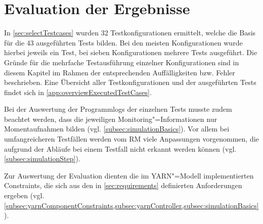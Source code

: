\chapter{Evaluation der Ergebnisse}
\label{ch:evaluationResults}

In \cref{sec:selectTestcases} wurden 32 Testkonfigurationen ermittelt, welche die Basis für die 43 ausgeführten Tests bilden.
Bei den meisten Konfigurationen wurde hierbei jeweils ein Test, bei sieben Konfigurationen mehrere Tests ausgeführt.
Die Gründe für die mehrfache Testausführung einzelner Konfigurationen sind in diesem Kapitel im Rahmen der entsprechenden Auffälligkeiten bzw. Fehler beschrieben.
Eine Übersicht aller Testkonfigurationen und der ausgeführten Tests findet sich in \cref{app:overviewExecutedTestCases}.

Bei der Auswertung der Programmlogs der einzelnen Tests musste zudem beachtet werden, dass die jeweiligen Monitoring"=Informationen nur Momentaufnahmen bilden (vgl. \cref{subsec:simulationBasics}).
Vor allem bei umfangreicheren Testfällen werden vom \gls{RM} viele Anpassungen vorgenommen, die aufgrund der Abläufe bei einem Testfall nicht erkannt werden können (vgl. \cref{subsec:simulationStep}).

Zur Auswertung der Evaluation dienten \uA die im YARN"=Modell implementierten Constraints, die sich aus den in \cref{sec:requirements} definierten Anforderungen ergeben (vgl. \cref{subsec:yarnComponentConstraints,subsec:yarnController,subsec:simulationBasics}).
















